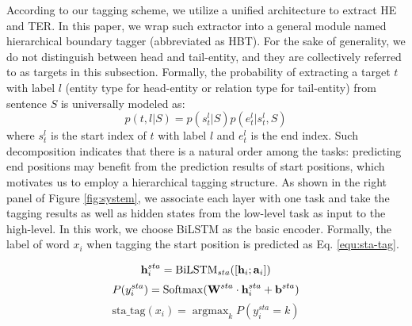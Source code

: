 \documentclass{ecai}
\begin{document}
According to our tagging scheme, we utilize a unified architecture to extract HE and TER. 
In this paper, we wrap such extractor into a general module named hierarchical boundary tagger (abbreviated as HBT). 
For the sake of generality, we do not distinguish between head and tail-entity, and they are collectively referred to as targets in this subsection. 
Formally, the probability of extracting a target $t$ with label $l$ (entity type for head-entity or relation type for tail-entity) from sentence $S$ is universally modeled as:
\begin{equation}
\label{equ:motiva2}
   p(t,l|S) = p(s_{t}^{l}|S)p(e_{t}^{l}|s_{t}^{l},S)
\end{equation}
where $s_{t}^{l}$ is the start index of $t$ with label $l$ and $e_{t}^{l}$ is the end index. 
Such decomposition indicates that there is a natural order among the tasks: predicting end positions may benefit from the prediction results of start positions, which motivates us to employ a hierarchical tagging structure.
As shown in the right panel of Figure \ref{fig:system}, we associate each layer with one task and take the tagging results as well as hidden states from the low-level task as input to the high-level. 
In this work, we choose BiLSTM \cite{hochreiter1997long} as the basic encoder.
Formally, the label of word $x_i$ when tagging the start position is predicted as Eq. \ref{equ:sta-tag}.


\begin{equation}
\label{equ:sta-input}
   \boldsymbol{\rm{h}}^{sta}_i = {\rm{BiLSTM}}_{sta}([\boldsymbol{\rm{h}}_i;\boldsymbol{\rm{a}}_i])
\end{equation}
\begin{equation}
P(y^{sta}_i) = {\rm{Softmax}}(\boldsymbol{\rm{W}}^{sta}\cdot \boldsymbol{\rm{h}}^{sta}_i + \boldsymbol{\rm{b}}^{sta})
\end{equation}
\begin{equation}
\label{equ:sta-tag}
\text{sta\_tag}(x_i)=\mathop{\arg\max}_{k} P(y^{sta}_i=k)
\end{equation}
\end{document}
